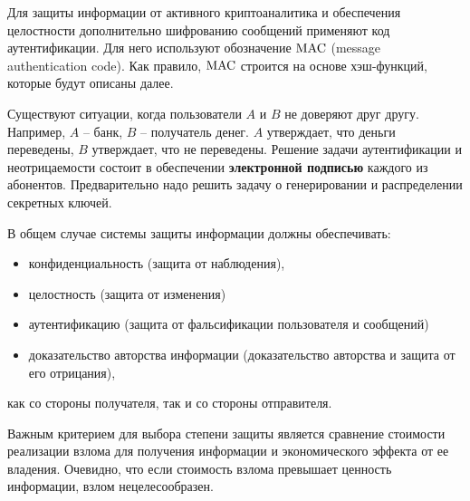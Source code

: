 Для защиты информации от активного криптоаналитика и обеспечения целостности дополнительно шифрованию сообщений применяют код аутентификации. Для него используют обозначение $\textrm{MAC}$ (message authentication code). Как правило, $\textrm{MAC}$ строится на основе хэш-функций, которые будут описаны далее.

Существуют ситуации, когда пользователи $A$ и $B$ не доверяют друг другу. Например, $A$ -- банк, $B$ -- получатель денег. $A$ утверждает, что деньги переведены, $B$ утверждает, что не переведены. Решение задачи аутентификации и неотрицаемости состоит в обеспечении \textbf{электронной подписью} каждого из абонентов. Предварительно надо решить задачу о генерировании и распределении секретных ключей.

В общем случае системы защиты информации должны обеспечивать:
\begin{itemize}
    \item конфиденциальность (защита от наблюдения),
    \item целостность (защита от изменения)
    \item аутентификацию (защита от фальсификации пользователя и сообщений)
    \item доказательство авторства информации (доказательство авторства и защита от его отрицания),
\end{itemize}
как со стороны получателя, так и со стороны отправителя.

Важным критерием для выбора степени защиты является сравнение стоимости реализации взлома для получения информации и экономического эффекта от ее владения. Очевидно, что если стоимость взлома превышает ценность информации, взлом нецелесообразен.

